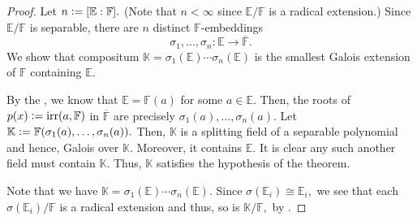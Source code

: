 \sepgaloisradical*\label{prop:sepgaloisradical2}
\begin{flushright}\hyperref[prop:sepgaloisradical]{\upsym}\end{flushright}
\begin{proof}
    Let $n \vcentcolon= [\mathbb{E} : \mathbb{F}].$ (Note that $n < \infty$ since $\mathbb{E}/\mathbb{F}$ is a radical extension.) Since $\mathbb{E}/\mathbb{F}$ is separable, there are $n$ distinct $\mathbb{F}$-embeddings
    \begin{equation*} 
        \sigma_1, \ldots, \sigma_n : \mathbb{E} \to \overline{\mathbb{F}}.
    \end{equation*}
    We show that compositum $\mathbb{K} = \sigma_1(\mathbb{E}) \cdots \sigma_n(\mathbb{E})$ is the smallest Galois extension of $\mathbb{F}$ containing $\mathbb{E}.$

    By the , we know that $\mathbb{E} = \mathbb{F}(a)$ for some $a \in \mathbb{E}.$ Then, the roots of $p(x) \vcentcolon= \operatorname{irr}(a, \mathbb{F})$ in $\overline{\mathbb{F}}$ are precisely $\sigma_1(a), \ldots, \sigma_n(a).$ Let $\mathbb{K} \vcentcolon= \mathbb{F}(\sigma_1(a), \ldots, \sigma_n(a)).$ Then, $\mathbb{K}$ is a splitting field of a separable polynomial and hence, Galois over $\mathbb{K}.$ Moreover, it contains $\mathbb{E}.$ It is clear any such another field must contain $\mathbb{K}.$ Thus, $\mathbb{K}$ satisfies the hypothesis of the theorem.

    Note that we have $\mathbb{K} = \sigma_1(\mathbb{E}) \cdots \sigma_n(\mathbb{E}).$ Since $\sigma(\mathbb{E}_i) \cong \mathbb{E}_i,$ we see that each $\sigma(\mathbb{E}_i)/\mathbb{F}$ is a radical extension and thus, so is $\mathbb{K}/\mathbb{F},$ by .
\end{proof}

